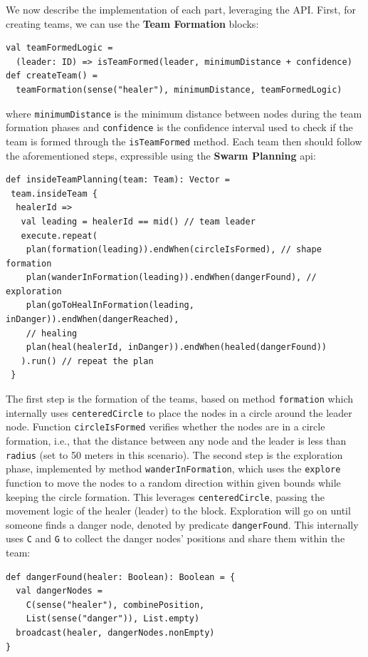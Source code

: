 %
We now describe the implementation of each part, leveraging the \MacroSwarm{} API. 
First, for creating teams, we can use the \textbf{Team Formation} blocks:
\begin{lstlisting}
val teamFormedLogic = 
  (leader: ID) => isTeamFormed(leader, minimumDistance + confidence)
def createTeam() = 
  teamFormation(sense("healer"), minimumDistance, teamFormedLogic)
\end{lstlisting}
where \lstinline|minimumDistance| is the minimum distance between nodes during the 
 team formation phases and \lstinline|confidence| is the confidence interval 
 used to check if the team is formed through the \lstinline|isTeamFormed| method.
%
Each team then should follow the aforementioned steps, 
 expressible using the \textbf{Swarm Planning} \ac{api}: 
%
\begin{lstlisting}[xrightmargin=-2pt]
def insideTeamPlanning(team: Team): Vector = 
 team.insideTeam {
  healerId =>
   val leading = healerId == mid() // team leader
   execute.repeat(
    plan(formation(leading)).endWhen(circleIsFormed), // shape formation
    plan(wanderInFormation(leading)).endWhen(dangerFound), // exploration
    plan(goToHealInFormation(leading, inDanger)).endWhen(dangerReached), 
    // healing
    plan(heal(healerId, inDanger)).endWhen(healed(dangerFound)) 
   ).run() // repeat the plan
 }
\end{lstlisting}
The first step is the formation of the teams, 
 based on method \lstinline|formation| which
 internally uses \lstinline|centeredCircle| 
  to place the nodes in a circle around the leader node. 
 Function \lstinline|circleIsFormed| verifies whether the nodes are in a circle formation, i.e., 
 that the distance between any node and the leader is less than \lstinline|radius| (set to 50 meters in this scenario).
%
The second step is the exploration phase, 
 implemented by method \lstinline|wanderInFormation|, 
 which uses the \lstinline|explore| function to move the nodes to a random direction
 within given bounds while keeping the circle formation.
 This leverages \lstinline|centeredCircle|,  passing 
 the movement logic of the healer (leader) to the block.
Exploration will go on until someone finds a danger node, 
 denoted by predicate \lstinline|dangerFound|.
This internally uses \lstinline|C| and \lstinline|G| to collect the danger nodes' positions
 and share them within the team:
\begin{lstlisting}
def dangerFound(healer: Boolean): Boolean = {
  val dangerNodes = 
    C(sense("healer"), combinePosition, 
    List(sense("danger")), List.empty)
  broadcast(healer, dangerNodes.nonEmpty)
}
\end{lstlisting}
